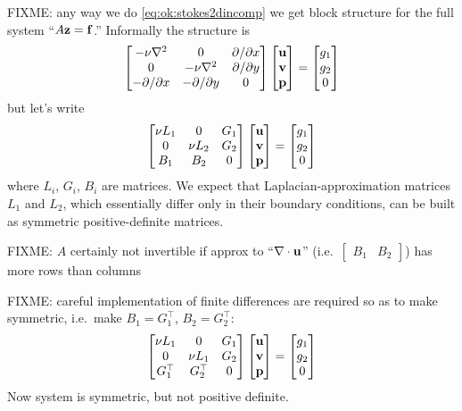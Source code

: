 FIXME: any way we do \eqref{eq:ok:stokes2dincomp} we get block structure for the full system ``$A \mathbf{z} = \mathbf{f}$.''  Informally the structure is
  $$\begin{bmatrix}
    -\nu\nabla^2 & 0 & \partial/\partial x \\
    0 & -\nu\nabla^2 & \partial/\partial y \\
    -\partial/\partial x & -\partial/\partial y & 0
    \end{bmatrix}
    \begin{bmatrix}
    \mathbf{u} \\ \mathbf{v} \\ \mathbf{p}
    \end{bmatrix}
    =
    \begin{bmatrix}
    g_1 \\ g_2 \\ 0
    \end{bmatrix}
    $$
but let's write
  $$\begin{bmatrix}
    \nu L_1 & 0 & G_1 \\
    0 & \nu L_2 & G_2 \\
    B_1 & B_2 & 0
    \end{bmatrix}
    \begin{bmatrix}
    \mathbf{u} \\ \mathbf{v} \\ \mathbf{p}
    \end{bmatrix}
    =
    \begin{bmatrix}
    g_1 \\ g_2 \\ 0
    \end{bmatrix}
    $$
where $L_i$, $G_i$, $B_i$ are matrices.  We expect that Laplacian-approximation matrices $L_1$ and $L_2$, which essentially differ only in their boundary conditions, can be built as symmetric positive-definite matrices.

FIXME: $A$ certainly not invertible if approx to ``$\nabla\cdot \mathbf{u}$'' (i.e.~$\begin{bmatrix} B_1 & B_2 \end{bmatrix}$) has more rows than columns

FIXME: careful implementation of finite differences are required so as to make symmetric, i.e.~make $B_1=G_1^\top$, $B_2=G_2^\top$:
    $$\begin{bmatrix}
    \nu L_1 & 0 & G_1 \\
    0 & \nu L_1 & G_2 \\
    G_1^\top & G_2^\top & 0
    \end{bmatrix}
    \begin{bmatrix}
    \mathbf{u} \\ \mathbf{v} \\ \mathbf{p}
    \end{bmatrix}
    =
    \begin{bmatrix}
    g_1 \\ g_2 \\ 0
    \end{bmatrix}$$
Now system is symmetric, but not positive definite.

